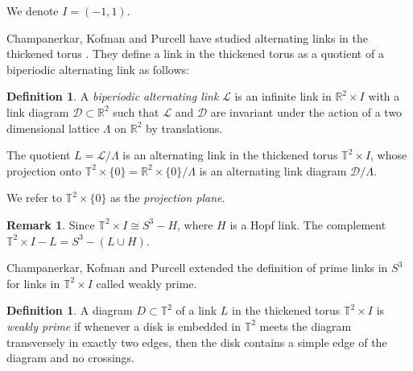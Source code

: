 \documentclass[11pt]{amsart}
\newcommand{\Sp}{{S}}
\newcommand{\R}{\mathbb{R}}
\newcommand{\torus}{{\mathbb{T}^2}}
\newcommand{\cD}{{\mathcal{D}}}
\newcommand{\cL}{{\mathcal{L}}}
\theoremstyle{plain}
\theoremstyle{definition}
\newtheorem{define}[theorem]{Definition}
\newtheorem{remark}[theorem]{Remark}
\begin{document}
We denote $I = (-1,1)$.


Champanerkar, Kofman and Purcell have studied alternating links in the thickened
torus \cite{CKP2}. They define a link in the thickened torus as a quotient of a
biperiodic alternating link as follows:
 
\begin{define}
\label{def:biperiodiclink}
A \emph{biperiodic alternating link} $\cL$ is an infinite link
in $\R^2 \times I$ with a link diagram $\cD \subset \R^2$
such that $\cL$ and $\cD$ are
invariant under the action of a two dimensional lattice $\Lambda$
on $\R^2$ by translations.


The quotient $L=\mathcal{L}/\Lambda$ is an alternating link in
the thickened torus $\torus \times I$,
whose projection onto $\torus \times \{0\} = \R^2 \times \{0\} /\Lambda$
is an alternating link diagram $\cD/\Lambda$.
\end{define}


We refer to $\torus \times \{0\}$ as the \emph{projection plane}.


\begin{remark}
Since $\torus \times I \cong \Sp^3 - H$, where $H$ is a Hopf link.
The complement $\torus \times I- L = \Sp^3 - (L \cup H)$.
\end{remark}

Champanerkar, Kofman and Purcell \cite{CKP2} extended
the definition of prime links in $\Sp^3$
for links in $\torus \times I$ called weakly prime. 

\begin{define} \label{def:weaklyprime}
A diagram $D \subset \torus$
of a link $L$ in the thickened torus $\torus \times I$
is \emph{weakly prime}
if whenever a disk is embedded in $\torus$
meets the diagram transversely in exactly two edges,
then the disk contains a simple edge of the diagram and no crossings.
\end{define}
\end{document}
